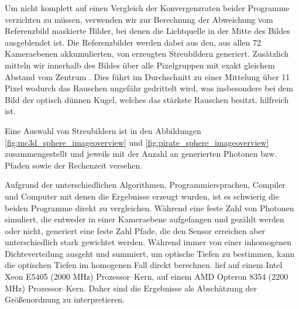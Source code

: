 	Um nicht komplett auf einen Vergleich der Konvergenzraten beider Programme verzichten zu müssen, verwenden wir zur Berechnung der Abweichung vom Referenzbild maskierte Bilder, bei denen die Lichtquelle in der Mitte des Bildes ausgeblendet ist.	 Die Referenzbilder %
	werden dabei aus den, aus allen 72 Kameraebenen akkumulierten, von \mctd erzeugten Streubildern generiert. Zusätzlich mitteln wir innerhalb des Bildes über alle Pixelgruppen mit exakt gleichem Abstand vom Zentrum%
	. Dies führt im Durchschnitt zu einer Mittelung über 11 Pixel wodurch das Rauschen ungefähr gedrittelt wird, was insbesondere bei dem Bild der optisch dünnen Kugel, welches das stärkste Rauschen besitzt, hilfreich ist.
	
		
	
	Eine Auswahl von Streubildern ist in den Abbildungen \ref{fig:mc3d_sphere_imageoverview} und \ref{fig:pirate_sphere_imageoverview} zusammengestellt und jeweils mit der Anzahl an generierten Photonen bzw. Pfaden sowie der Rechenzeit versehen.
	
	Aufgrund der unterschiedlichen Algorithmen, Programmiersprachen, Compiler und Computer mit denen die Ergebnisse erzeugt wurden, ist es schwierig die beiden Programme direkt zu vergleichen. Während \mctd eine feste Zahl von Photonen simuliert, die entweder in einer Kameraebene aufgefangen und gezählt werden oder nicht, generiert \pirate eine feste Zahl Pfade, die den Sensor erreichen aber unterschiedlich stark gewichtet werden. Während \mctd immer von einer inhomogenen Dichteverteilung ausgeht und summiert, um optische Tiefen zu bestimmen, kann \pirate die optischen Tiefen im homogenen Fall direkt berechnen. \mctd lief auf einem Intel Xeon E5405 (2000 MHz) Prozessor--Kern, \pirate auf einem AMD Opteron 8354 (2200 MHz) Prozessor--Kern. Daher sind die Ergebnisse als Abschätzung der Größenordnung zu interpretieren.
	

